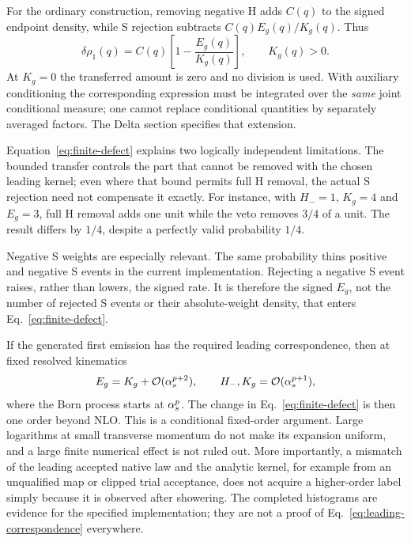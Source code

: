 For the ordinary construction, removing negative H adds $C(q)$ to the
signed endpoint density, while S rejection subtracts
$C(q)E_g(q)/K_g(q)$. Thus
\begin{equation}
 \delta\rho_1(q)=C(q)\left[1-\frac{E_g(q)}{K_g(q)}\right],
 \qquad K_g(q)>0.
 \label{eq:finite-defect}
\end{equation}
At $K_g=0$ the transferred amount is zero and no division is used. With
auxiliary conditioning the corresponding expression must be integrated
over the \emph{same} joint conditional measure; one cannot replace
conditional quantities by separately averaged factors. The Delta section
specifies that extension.

Equation~\eqref{eq:finite-defect} explains two logically independent
limitations. The bounded transfer controls the part that cannot be
removed with the chosen leading kernel; even where that bound permits
full H removal, the actual S rejection need not compensate it exactly.
For instance, with $H_-=1$, $K_g=4$ and $E_g=3$, full H removal adds one
unit while the veto removes $3/4$ of a unit. The result differs by
$1/4$, despite a perfectly valid probability $1/4$.

Negative S weights are especially relevant. The same probability thins
positive and negative S events in the current implementation. Rejecting
a negative S event raises, rather than lowers, the signed rate. It is
therefore the signed $E_g$, not the number of rejected S events or their
absolute-weight density, that enters Eq.~\eqref{eq:finite-defect}.

If the generated first emission has the required leading correspondence,
then at fixed resolved kinematics
\begin{equation}
 E_g=K_g+\mathcal O(\alpha_s^{p+2}),\qquad
 H_-,K_g=\mathcal O(\alpha_s^{p+1}),
 \label{eq:leading-correspondence}
\end{equation}
where the Born process starts at $\alpha_s^p$. The change in
Eq.~\eqref{eq:finite-defect} is then one order beyond NLO. This is a
conditional fixed-order argument. Large logarithms at small transverse
momentum do not make its expansion uniform, and a large finite numerical
effect is not ruled out. More importantly, a mismatch of the leading
accepted native law and the analytic kernel, for example from an
unqualified map or clipped trial acceptance, does not acquire a
higher-order label simply because it is observed after showering. The
completed histograms are evidence for the specified implementation;
they are not a proof of Eq.~\eqref{eq:leading-correspondence} everywhere.

